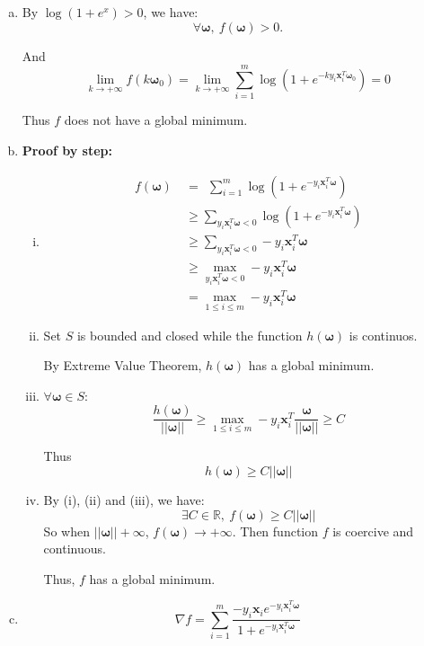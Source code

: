 \documentclass{article}
\def\RR{\mathbb{R}}
\def\bw{\boldsymbol{\omega}}
\def\bx{\boldsymbol{x}}
\def\vvert{\vert\vert}
\begin{document}
\begin{enumerate}[(a)]
	\item
		By $\log(1+e^x)>0$, we have:
		$$\forall \bw,\ f(\bw)>0.$$

		And $$
		\lim_{k\to+\infty}f(k\bw_0)=
		\lim_{k\to+\infty}\sum_{i=1}^m \log(1+e^{-ky_i\bx_i^T\bw_0})=0
		$$

		Thus $f$ does not have a global minimum.
	\item
		\textbf{Proof by step:}
		\begin{enumerate}[(i)]
			\item 
			\begin{equation*}
			\begin{aligned}
				f(\bw)\ & =\ \  
				\sum_{i=1}^m \log(1+e^{-y_i\bx_i^T\bw})
				\\
				& \ge
				\sum_{y_i\bx_i^T\bw<0}
				\log(1+e^{-y_i\bx_i^T\bw})
				\\
				& \ge
				\sum_{y_i\bx_i^T\bw<0}
				-y_i\bx_i^T\bw
				\\
				& \ge
				\max_{y_i\bx_i^T\bw<0}-y_i\bx_i^T\bw
				\\
				& =
				\max_{1 \le i \le m} -y_i\bx_i^T\bw
			\end{aligned}
			\end{equation*}
			
		\item
			Set $S$ is bounded and closed while the function $h(\bw)$ is continuos.

			By Extreme Value Theorem, $h(\bw)$ has a global minimum.

		\item
			$\forall \bw\in S$:
			$$
			\frac{h(\bw)}{\vvert\bw\vvert}
			\ge
			\max_{1\le i\le m} -y_i\bx_i^T\frac{\bw}{\vvert\bw\vvert}
			\ge C
			$$

		Thus
		$$h(\bw)\ge C\vvert\bw\vvert$$
		\item
			By (i), (ii) and (iii), we have:
			$$
			\exists C\in\RR,\ f(\bw)\ge C\vvert\bw\vvert
			$$
			So when $\vvert\bw\vvert+\infty$, $f(\bw)\to+\infty$. Then function $f$ is coercive and continuous.

			Thus, $f$ has a global minimum.
		\end{enumerate}

	\item 
		$$\nabla f=\sum_{i=1}^m 
		\frac{-y_i\bx_i e^{-y_i\bx_i^T\bw}}
		{1+e^{-y_i\bx_i^T\bw}}
		$$


\end{enumerate}

\newpage
\end{document}

